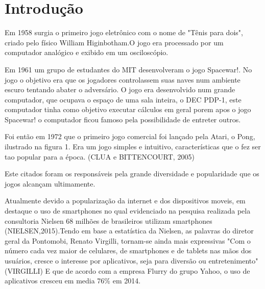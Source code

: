 \chapter{Introdução}
\label{cap:introducao}
 
 
Em 1958 surgia o primeiro jogo eletrônico com o nome de "Tênis para dois", criado pelo físico William Higinbotham.O jogo era processado por um computador analógico e exibido em um osciloscópio.


Em 1961 um grupo de estudantes do MIT desenvolveram o jogo Spacewar!. No jogo o objetivo era que os jogadores controlassem suas naves num ambiente escuro tentando abater o adversário. O jogo era desenvolvido num grande computador, que ocupava o espaço de uma sala inteira, o DEC PDP-1, este computador tinha como objetivo executar cálculos em geral porem apos o jogo Spacewar! o computador ficou famoso pela possibilidade de entreter outros.


Foi então em 1972 que o primeiro jogo comercial foi lançado pela Atari, o Pong, ilustrado na figura 1. Era um jogo simples e intuitivo, características que o fez ser tao popular para a época. (CLUA e BITTENCOURT, 2005) 

\begin{figure}[h!]
		\centering
	\end{figure}


Este citados foram os responsáveis pela grande diversidade e popularidade que os jogos alcançam ultimamente.

Atualmente devido a popularização da internet e dos dispositivos moveis, em destaque o uso de smartphones no qual evidenciado na pesquisa realizada pela consultoria Nielsen 68 milhões de brasileiros utilizam smartphones (NIELSEN,2015).Tendo em base a estatística da Nielsen, as palavras do diretor geral da Pontomobi, Renato Virgilli, tornam-se ainda mais expressivas "Com o número cada vez maior de celulares, de smartphones e de tablets nas mãos dos usuários, cresce o interesse por aplicativos, seja para diversão ou entretenimento" (VIRGILLI)
E que de acordo com a empresa Flurry do grupo Yahoo, o uso de aplicativos cresceu em media 76\% em 2014.
	

